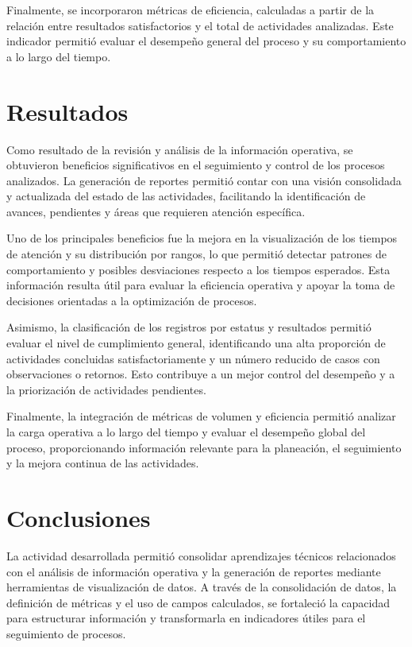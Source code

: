 \documentclass[12pt]{article}
\begin{document}
Finalmente, se incorporaron métricas de eficiencia, calculadas a partir de la relación entre resultados satisfactorios y el total de actividades analizadas. Este indicador permitió evaluar el desempeño general del proceso y su comportamiento a lo largo del tiempo.


\section*{Resultados}
Como resultado de la revisión y análisis de la información operativa, se obtuvieron beneficios significativos en el seguimiento y control de los procesos analizados. La generación de reportes permitió contar con una visión consolidada y actualizada del estado de las actividades, facilitando la identificación de avances, pendientes y áreas que requieren atención específica.

Uno de los principales beneficios fue la mejora en la visualización de los tiempos de atención y su distribución por rangos, lo que permitió detectar patrones de comportamiento y posibles desviaciones respecto a los tiempos esperados. Esta información resulta útil para evaluar la eficiencia operativa y apoyar la toma de decisiones orientadas a la optimización de procesos.

Asimismo, la clasificación de los registros por estatus y resultados permitió evaluar el nivel de cumplimiento general, identificando una alta proporción de actividades concluidas satisfactoriamente y un número reducido de casos con observaciones o retornos. Esto contribuye a un mejor control del desempeño y a la priorización de actividades pendientes.

Finalmente, la integración de métricas de volumen y eficiencia permitió analizar la carga operativa a lo largo del tiempo y evaluar el desempeño global del proceso, proporcionando información relevante para la planeación, el seguimiento y la mejora continua de las actividades.


\section*{Conclusiones}
La actividad desarrollada permitió consolidar aprendizajes técnicos relacionados con el análisis de información operativa y la generación de reportes mediante herramientas de visualización de datos. A través de la consolidación de datos, la definición de métricas y el uso de campos calculados, se fortaleció la capacidad para estructurar información y transformarla en indicadores útiles para el seguimiento de procesos.
\end{document}
